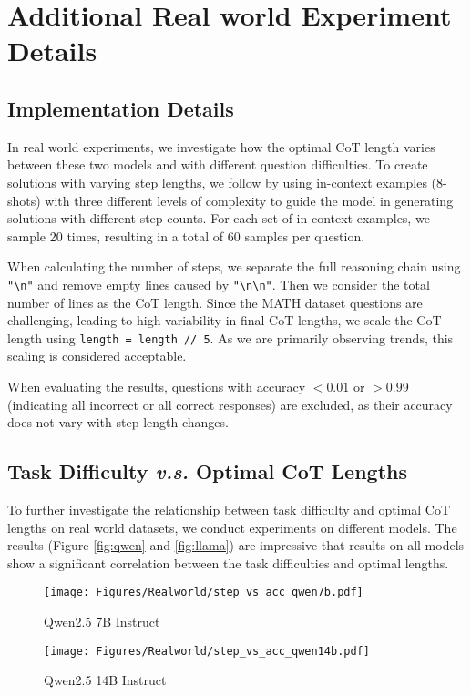 \section{Additional Real world Experiment Details}
\subsection{Implementation Details}
\label{app:real_world}
In real world experiments, we investigate how the optimal CoT length varies between these two models and with different question difficulties. To create solutions with varying step lengths, we follow \citep{complex-prompt} by using in-context examples (8-shots) with three different levels of complexity to guide the model in generating solutions with different step counts. For each set of in-context examples, we sample 20 times, resulting in a total of 60 samples per question. 

When calculating the number of steps, we separate the full reasoning chain using \texttt{"\textbackslash n"}\citep{complex-prompt} and remove empty lines caused by \texttt{"\textbackslash n\textbackslash n"}. Then we consider the total number of lines as the CoT length. Since the MATH dataset questions are challenging, leading to high variability in final CoT lengths, we scale the CoT length using \texttt{length = length // 5}. As we are primarily observing trends, this scaling is considered acceptable.

When evaluating the results, questions with accuracy $<0.01$ or $>0.99$ (indicating all incorrect or all correct responses) are excluded, as their accuracy does not vary with step length changes.
\subsection{Task Difficulty \textit{v.s.} Optimal CoT Lengths}
\label{app:difficulty}
To further investigate the relationship between task difficulty and optimal CoT lengths on real world datasets, we conduct experiments on different models. The results (Figure \ref{fig:qwen} and \ref{fig:llama}) are impressive that results on all models show a significant correlation between the task difficulties and optimal lengths.

\begin{figure*}[ht]
\centering

\begin{subfigure}{0.45\textwidth}
    \centering
    \texttt{[image: Figures/Realworld/step\_vs\_acc\_qwen7b.pdf]}
    \caption{Qwen2.5 7B Instruct}
    \label{fig:step_vs_acc_qwen7b}
\end{subfigure}%
\begin{subfigure}{0.45\textwidth}
    \centering
    \texttt{[image: Figures/Realworld/step\_vs\_acc\_qwen14b.pdf]}
    \caption{Qwen2.5 14B Instruct}
    \label{fig:step_vs_acc_qwen14b}
\end{subfigure}
\caption{Evaluation between task difficulties and optimal CoT lengths on MATH datasets with Qwen2.5 Series Instruct models. }
\label{fig:qwen}
\end{figure*}


